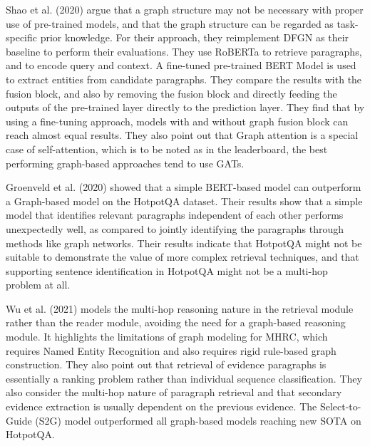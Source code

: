 \documentclass[sigplan,screen,nonacm]{acmart}
\begin{document}
Shao et al. (2020) \cite{RN127} argue that a graph structure may not be necessary with proper use of pre-trained models, and that the graph 
structure can be regarded as task-specific prior knowledge. For their approach, they reimplement DFGN \cite{RN122} as their baseline to perform 
their evaluations. They use RoBERTa \cite{RN171} to retrieve paragraphs, and to encode query and context. A fine-tuned pre-trained BERT Model 
is used to extract entities from candidate paragraphs. They compare the results with the fusion block, and also by removing the fusion block 
and directly feeding the outputs of the pre-trained layer directly to the prediction layer. They find that by using a fine-tuning approach, 
models with and without graph fusion block can reach almost equal results. They also point out that Graph 
attention is a special case of self-attention, which is to be noted as in the leaderboard, the best performing graph-based approaches tend 
to use GATs.

Groenveld et al. (2020) \cite{RN126} showed that a simple BERT-based model can outperform a Graph-based model on the HotpotQA dataset.
Their results show that a simple model that identifies relevant paragraphs independent of each other performs unexpectedly well, as compared to 
jointly identifying the paragraphs through methods like graph networks. Their results indicate that HotpotQA might not be suitable to 
demonstrate the value of more complex retrieval techniques, and that supporting sentence identification in HotpotQA might not be a multi-hop 
problem at all.

Wu et al. (2021) \cite{RN106} models the multi-hop reasoning nature in the retrieval module rather than the reader module, avoiding the need 
for a graph-based reasoning module. It highlights the limitations of graph modeling for MHRC, which requires Named Entity Recognition and 
also requires rigid rule-based graph construction. They also point out that retrieval of evidence paragraphs is essentially a ranking problem 
rather than individual sequence classification. They also consider the multi-hop nature of paragraph retrieval and that secondary evidence 
extraction is usually dependent on the previous evidence. The Select-to-Guide (S2G) model outperformed all graph-based models reaching new 
SOTA on HotpotQA.
\end{document}
